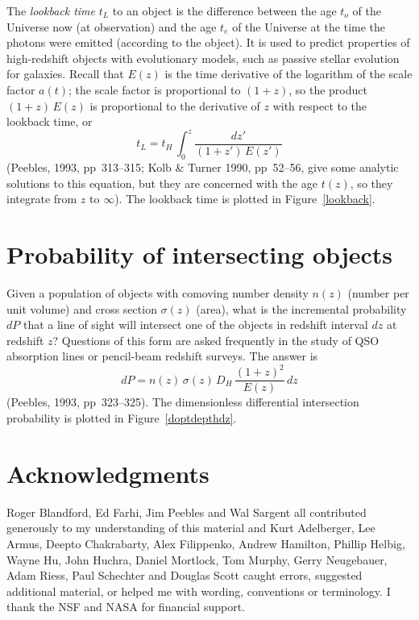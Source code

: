 The {\em lookback time\/} $t_L$ to an object is the difference between
the age $t_o$ of the Universe now (at observation) and the age $t_e$
of the Universe at the time the photons were emitted (according to the
object).  It is used to predict properties of high-redshift objects
with evolutionary models, such as passive stellar evolution for
galaxies.  Recall that $E(z)$ is the time derivative of the logarithm
of the scale factor $a(t)$; the scale factor is proportional to
$(1+z)$, so the product $(1+z)\,E(z)$ is proportional to the
derivative of $z$ with respect to the lookback time, or
\begin{equation}
t_L = t_H\,\int_0^z \frac{dz'}{(1+z')\,E(z')}
\end{equation}
(Peebles, 1993, pp~313--315; Kolb \& Turner 1990, pp~52--56, give
some analytic solutions to this equation, but they are concerned with
the age $t(z)$, so they integrate from $z$ to $\infty$).  The lookback
time is plotted in Figure~\ref{lookback}.


\section{Probability of intersecting objects}
\label{sec:optdepth}

Given a population of objects with comoving number density $n(z)$
(number per unit volume) and cross section $\sigma(z)$ (area), what is
the incremental probability $dP$ that a line of sight will intersect
one of the objects in redshift interval $dz$ at redshift $z$?
Questions of this form are asked frequently in the study of QSO
absorption lines or pencil-beam redshift surveys.  The answer is
\begin{equation}
dP=n(z)\,\sigma(z)\,D_H\,\frac{(1+z)^2}{E(z)}\,dz
\end{equation}
(Peebles, 1993, pp~323--325).  The dimensionless differential
intersection probability is plotted in Figure~\ref{doptdepthdz}.


\section*{Acknowledgments}

Roger Blandford, Ed Farhi, Jim Peebles and Wal Sargent all contributed
generously to my understanding of this material and Kurt Adelberger,
Lee Armus, Deepto Chakrabarty, Alex Filippenko, Andrew Hamilton,
Phillip Helbig, Wayne Hu, John Huchra, Daniel Mortlock, Tom Murphy,
Gerry Neugebauer, Adam Riess, Paul Schechter and Douglas Scott caught
errors, suggested additional material, or helped me with wording,
conventions or terminology.  I thank the NSF and NASA for financial
support.

